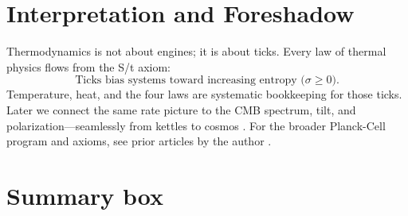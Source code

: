 \section*{Interpretation and Foreshadow}
Thermodynamics is not about engines; it is about ticks.
Every law of thermal physics flows from the S/t axiom:
\[
\text{Ticks bias systems toward increasing entropy (\(\sigma\ge 0\)).}
\]
Temperature, heat, and the four laws are systematic bookkeeping for those ticks.
Later we connect the same rate picture to the CMB spectrum, tilt, and polarization—seamlessly from kettles to cosmos \cite{peebles1993principles,planck2018params}. For the broader Planck-Cell program and axioms, see prior articles by the author \cite{langstaff_zenodo_16908311}.

\section*{Summary box}
